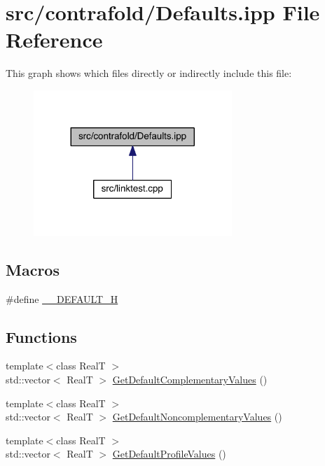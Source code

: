 \hypertarget{contrafold_2_defaults_8ipp}{\section{src/contrafold/\+Defaults.ipp File Reference}
\label{contrafold_2_defaults_8ipp}
}
This graph shows which files directly or indirectly include this file\+:
\nopagebreak
\begin{figure}[H]
\begin{center}
\leavevmode
\includegraphics[width=212pt]{contrafold_2_defaults_8ipp__dep__incl}
\end{center}
\end{figure}
\subsection*{Macros}
\begin{DoxyCompactItemize}
\item 
\#define \hyperlink{contrafold_2_defaults_8ipp_a51c3d9779a92f7aeb0a4dd13564d7400}{\+\_\+\+\_\+\+D\+E\+F\+A\+U\+L\+T\+\_\+\+H}
\end{DoxyCompactItemize}
\subsection*{Functions}
\begin{DoxyCompactItemize}
\item 
{\footnotesize template$<$class Real\+T $>$ }\\std\+::vector$<$ Real\+T $>$ \hyperlink{contrafold_2_defaults_8ipp_afb5a440e88f64e6252d019b095e8846a}{Get\+Default\+Complementary\+Values} ()
\item 
{\footnotesize template$<$class Real\+T $>$ }\\std\+::vector$<$ Real\+T $>$ \hyperlink{contrafold_2_defaults_8ipp_a3a5415fe91bb146372175c7b5b690a55}{Get\+Default\+Noncomplementary\+Values} ()
\item 
{\footnotesize template$<$class Real\+T $>$ }\\std\+::vector$<$ Real\+T $>$ \hyperlink{contrafold_2_defaults_8ipp_ac546b0a743dfca80b923a6e37bc68509}{Get\+Default\+Profile\+Values} ()
\end{DoxyCompactItemize}



